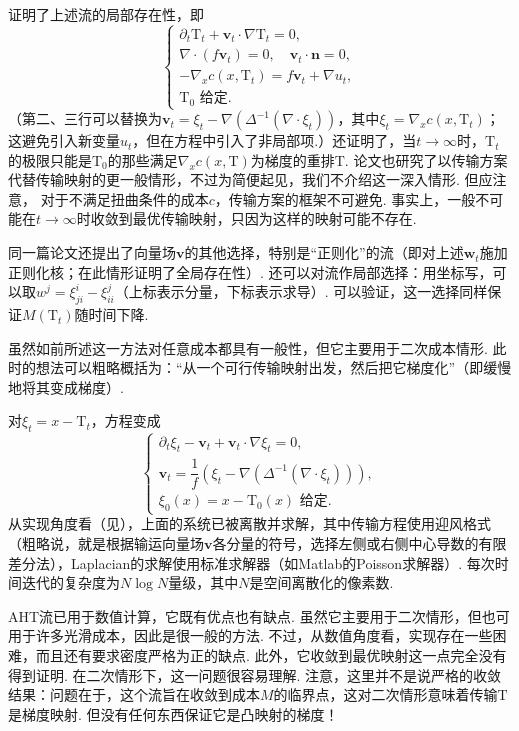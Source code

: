 \cite{b19}证明了上述流的局部存在性，即
\[
\begin{cases}
\partial_t\mathrm T_t+\mathbf v_t\cdot\nabla\mathrm T_t=0,\\
\nabla\cdot(f\mathbf v_t)=0,\quad\mathbf v_t\cdot\mathbf n=0,\\
-\nabla_xc(x,\mathrm T_t)=f\mathbf v_t+\nabla u_t,\\
\mathrm T_0\text{ 给定}.
\end{cases}
\]
（第二、三行可以替换为$\mathbf v_t=\xi_t-\nabla(\Delta^{-1}(\nabla\cdot\xi_t))$，其中$\xi_t=\nabla_xc(x,\mathrm T_t)$；这避免引入新变量$u_t$，但在方程中引入了非局部项.）还证明了，当$t\to\infty$时，$\mathrm T_t$的极限只能是$\mathrm T_0$的那些满足$\nabla_xc(x,\mathrm T)$为梯度的重排$\mathrm T$. 论文也研究了以传输方案代替传输映射的更一般情形，不过为简便起见，我们不介绍这一深入情形. 但应注意，\label{idx:i153-p229}
对于不满足扭曲条件的成本$c$，传输方案的框架不可避免. 事实上，一般不可能在$t\to\infty$时收敛到最优传输映射，只因为这样的映射可能不存在.

同一篇论文\cite{b19}还提出了向量场$\mathbf v$的其他选择，特别是“正则化”的流（即对上述$\mathbf w_t$施加正则化核；在此情形证明了全局存在性）. 还可以对流作局部选择：用坐标写，可以取$w^j=\xi^i_{ji}-\xi^j_{ii}$（上标表示分量，下标表示求导）. 可以验证，这一选择同样保证$M(\mathrm T_t)$随时间下降.

虽然如前所述这一方法对任意成本都具有一般性，但它主要用于二次成本情形. 此时的想法可以粗略概括为：“从一个可行传输映射出发，然后把它梯度化”（即缓慢地将其变成梯度）.

对$\xi_t=x-\mathrm T_t$，方程变成
\[
\begin{cases}
\partial_t\xi_t-\mathbf v_t+\mathbf v_t\cdot\nabla\xi_t=0,\\
\mathbf v_t=\dfrac1f\left(\xi_t-\nabla(\Delta^{-1}(\nabla\cdot\xi_t))\right),\\
\xi_0(x)=x-\mathrm T_0(x)\text{ 给定}.
\end{cases}
\]
从实现角度看（见\cite{b20}），上面的系统已被离散并求解，其中传输方程使用迎风格式（粗略说，就是根据输运向量场$\mathbf v$各分量的符号，选择左侧或右侧中心导数的有限差分法），Laplacian的求解使用标准求解器（如Matlab的Poisson求解器）. 每次时间迭代的复杂度为$N\log N$量级，其中$N$是空间离散化的像素数.

AHT流已用于数值计算，它既有优点也有缺点. 虽然它主要用于二次情形，但也可用于许多光滑成本，因此是很一般的方法. 不过，从数值角度看，实现存在一些困难，而且还有要求密度严格为正的缺点. 此外，它收敛到最优映射这一点完全没有得到证明. 在二次情形下，这一问题很容易理解. 注意，这里并不是说严格的收敛结果：问题在于，这个流旨在收敛到成本$M$的临界点，这对二次情形意味着传输$\mathrm T$是梯度映射. 但没有任何东西保证它是凸映射的梯度！

